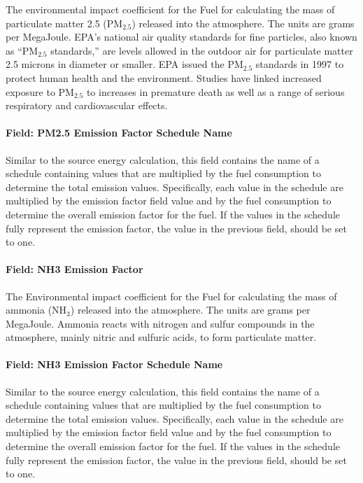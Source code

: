 The environmental impact coefficient for the Fuel for calculating the mass of particulate matter 2.5 (PM\(_{2.5}\)) released into the atmosphere. The units are grams per MegaJoule. EPA's national air quality standards for fine particles, also known as ``PM\(_{2.5}\) standards,'' are levels allowed in the outdoor air for particulate matter 2.5 microns in diameter or smaller. EPA issued the PM\(_{2.5}\) standards in 1997 to protect human health and the environment. Studies have linked increased exposure to PM\(_{2.5}\) to increases in premature death as well as a range of serious respiratory and cardiovascular effects.

\paragraph{Field: PM2.5 Emission Factor Schedule Name}\label{field-pm2.5-emission-factor-schedule-name}

Similar to the source energy calculation, this field contains the name of a schedule containing values that are multiplied by the fuel consumption to determine the total emission values. Specifically, each value in the schedule are multiplied by the emission factor field value and by the fuel consumption to determine the overall emission factor for the fuel. If the values in the schedule fully represent the emission factor, the value in the previous field, should be set to one.

\paragraph{Field: NH3 Emission Factor}\label{field-nh3-emission-factor}

The Environmental impact coefficient for the Fuel for calculating the mass of ammonia (NH\(_{3}\)) released into the atmosphere. The units are grams per MegaJoule. Ammonia reacts with nitrogen and sulfur compounds in the atmosphere, mainly nitric and sulfuric acids, to form particulate matter.

\paragraph{Field: NH3 Emission Factor Schedule Name}\label{field-nh3-emission-factor-schedule-name}

Similar to the source energy calculation, this field contains the name of a schedule containing values that are multiplied by the fuel consumption to determine the total emission values. Specifically, each value in the schedule are multiplied by the emission factor field value and by the fuel consumption to determine the overall emission factor for the fuel. If the values in the schedule fully represent the emission factor, the value in the previous field, should be set to one.

